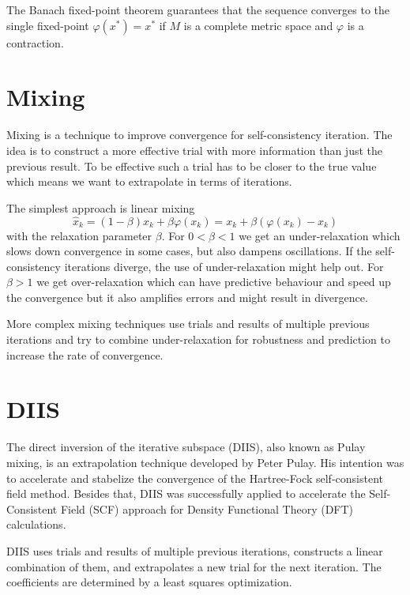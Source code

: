 The Banach fixed-point theorem guarantees that the sequence converges to the single fixed-point \(\varphi(x^\ast) = x^\ast\) if \(M\) is a complete metric space and \(\varphi\) is a contraction.

\section{Mixing}
Mixing is a technique to improve convergence for self-consistency iteration. The idea is to construct a more effective trial with more information than just the previous result. To be effective such a trial has to be closer to the true value which means we want to extrapolate in terms of iterations.

The simplest approach is linear mixing
\begin{equation} \label{eq:linmix}
\hat{x}_k = (1-\beta) x_k + \beta \varphi(x_k) = x_k + \beta (\varphi(x_k) - x_k)
\end{equation}
with the relaxation parameter \(\beta\).
For \(0 < \beta < 1\) we get an under-relaxation which slows down convergence in some cases, but also dampens oscillations. If the self-consistency iterations diverge, the use of under-relaxation might help out.
For \(\beta > 1\) we get over-relaxation which can have predictive behaviour and speed up the convergence but it also amplifies errors and might result in divergence.

More complex mixing techniques use trials and results of multiple previous iterations and try to combine under-relaxation for robustness and prediction to increase the rate of convergence.

\section{DIIS}
The direct inversion of the iterative subspace (DIIS), also known as Pulay mixing, is an extrapolation technique developed by Peter Pulay. His intention was to accelerate and stabelize the convergence of the Hartree-Fock self-consistent field method.\cite{diis_pulay1}\cite{diis_pulay2} Besides that, DIIS was successfully applied to accelerate the Self-Consistent Field (SCF) approach for Density Functional Theory (DFT) calculations.\cite{diis_restarted}

DIIS uses trials and results of multiple previous iterations, constructs a linear combination of them, and extrapolates a new trial for the next iteration. The coefficients are determined by a least squares optimization.

